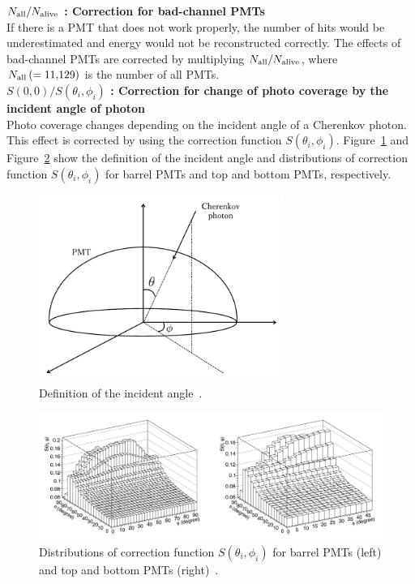 \textbf{$N_{\rm all}/N_{\rm alive}$ : Correction for bad-channel PMTs}\\
\hs
If there is a PMT that does not work properly, the number of hits would be underestimated and energy would not be reconstructed correctly.
The effects of bad-channel PMTs are corrected by multiplying $N_{\rm all}/N_{\rm alive}$, where $N_{\rm all}\,(= 11{,}129)$ is the number of all PMTs.\\

\textbf{$S(0,0)/S(\theta_{i},\phi_{i})$ : Correction for change of photo coverage by the incident angle of photon}\\
\hs
Photo coverage changes depending on the incident angle of a Cherenkov photon.
This effect is corrected by using the correction function $S(\theta_{i},\phi_{i})$.
Figure~\ref{Recons_PMT_theta_phi} and Figure~\ref{Recons_PMTCorrFunc} show the definition of the incident angle and distributions of correction function $S(\theta_{i},\phi_{i})$ for barrel PMTs and top and bottom PMTs, respectively.\\

\begin{figure}[h]
	\centering
	\includegraphics[width=8cm]{Figures/Reconstruction/PMT_theta_phi}
	\caption[Definition of the incident angle]{
	Definition of the incident angle~\cite{2021ShinokiMas}.
	}\label{Recons_PMT_theta_phi}
\end{figure}

\begin{figure}[h]
	\centering
	\includegraphics[width=16cm]{Figures/Reconstruction/PMTCorrFunc}
	\caption[Distributions of correction function $S(\theta_{i},\phi_{i})$ for barrel PMTs and top and bottom PMTs]{
	Distributions of correction function $S(\theta_{i},\phi_{i})$ for barrel PMTs (left) and top and bottom PMTs (right)~\cite{2021ShinokiMas}.
	}\label{Recons_PMTCorrFunc}
\end{figure}


